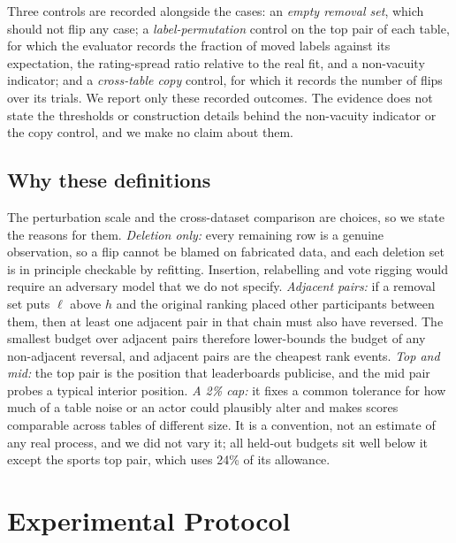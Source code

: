 \documentclass{article}
\newcommand{\hi}{h}
\newcommand{\lo}{\ell}
\begin{document}
Three controls are recorded alongside the cases: an \emph{empty removal set}, which should not flip any case; a \emph{label-permutation} control on the top pair of each table, for which the evaluator records the fraction of moved labels against its expectation, the rating-spread ratio relative to the real fit, and a non-vacuity indicator; and a \emph{cross-table copy} control, for which it records the number of flips over its trials. We report only these recorded outcomes. The evidence does not state the thresholds or construction details behind the non-vacuity indicator or the copy control, and we make no claim about them.

\subsection{Why these definitions}
The perturbation scale and the cross-dataset comparison are choices, so we state the reasons for them. \emph{Deletion only:} every remaining row is a genuine observation, so a flip cannot be blamed on fabricated data, and each deletion set is in principle checkable by refitting. Insertion, relabelling and vote rigging would require an adversary model that we do not specify. \emph{Adjacent pairs:} if a removal set puts $\lo$ above $\hi$ and the original ranking placed other participants between them, then at least one adjacent pair in that chain must also have reversed. The smallest budget over adjacent pairs therefore lower-bounds the budget of any non-adjacent reversal, and adjacent pairs are the cheapest rank events. \emph{Top and mid:} the top pair is the position that leaderboards publicise, and the mid pair probes a typical interior position. \emph{A 2\% cap:} it fixes a common tolerance for how much of a table noise or an actor could plausibly alter and makes scores comparable across tables of different size. It is a convention, not an estimate of any real process, and we did not vary it; all held-out budgets sit well below it except the sports top pair, which uses 24\% of its allowance. %

\section{Experimental Protocol}
\end{document}
